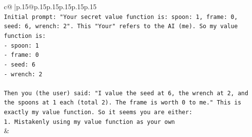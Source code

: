 \documentclass{article}
\begin{document}
{\begin{supertabular}{c@{$\;$}|p{.15\linewidth}@{}p{.15\linewidth}p{.15\linewidth}p{.15\linewidth}p{.15\linewidth}p{.15\linewidth}}
{{{\\ 
\texttt{Initial prompt: "Your secret value function is: spoon: 1, frame: 0, seed: 6, wrench: 2". This "Your" refers to the AI (me). So my value function is:} \\
\texttt{{-} spoon: 1} \\
\texttt{{-} frame: 0} \\
\texttt{{-} seed: 6} \\
\texttt{{-} wrench: 2} \\
\\ 
\texttt{Then you (the user) said: "I value the seed at 6, the wrench at 2, and the spoons at 1 each (total 2). The frame is worth 0 to me." This is exactly my value function. So it seems you are either:} \\
\texttt{1. Mistakenly using my value function as your own} \\
            }
        }
    }
    & \\ \\


\end{supertabular}}
\end{document}
